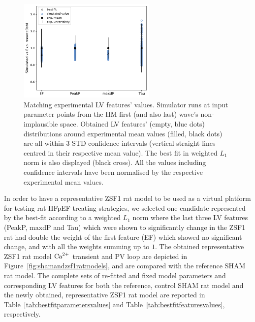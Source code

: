 \begin{figure}[ht!]
    \myfloatalign
    \includegraphics[width=0.6\textwidth]{figures/chapter07/w1_features_match.pdf}
    \caption{Matching experimental LV features' values. Simulator runs at input parameter points from the HM first (and also last) wave's non-implausible space. Obtained LV features’ (empty, blue dots) distributions around experimental mean values (filled, black dots) are all within 3 STD confidence intervals (vertical straight lines centred in their respective mean value). The best fit in weighted $L_1$ norm is also displayed (black cross). All the values including confidence intervals have been normalised by the respective experimental mean values.}
    \label{fig:w1bestzsf1model}
\end{figure}

\vspace{0.2cm}
In order to have a representative ZSF1 rat model to be used as a virtual platform for testing rat HFpEF-treating strategies, we selected one candidate represented by the best-fit according to a weighted $L_1$ norm where the last three LV features (PeakP, maxdP and Tau) which were shown to significantly change in the ZSF1 rat had double the weight of the first feature (EF) which showed no significant change, and with all the weights summing up to $1$. The obtained representative ZSF1 rat model $\textrm{Ca}^{2+}$ transient and PV loop are depicted in Figure~\ref{fig:shamandzsf1ratmodels}, and are compared with the reference SHAM rat model. The complete sets of re-fitted and fixed model parameters and corresponding LV features for both the reference, control SHAM rat model and the newly obtained, representative ZSF1 rat model are reported in Table~\ref{tab:bestfitparametersvalues} and Table~\ref{tab:bestfitfeaturesvalues}, respectively.

